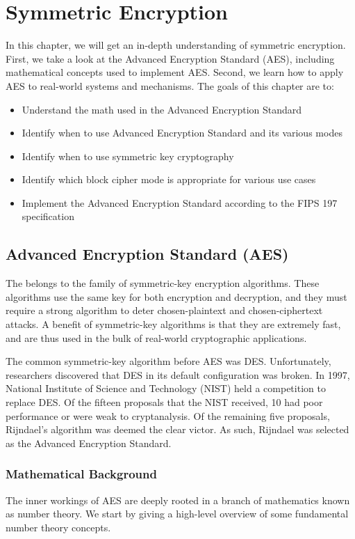 \chapter{Symmetric Encryption}
In this chapter, we will get an in-depth understanding of symmetric encryption. First, we take a look at the Advanced Encryption Standard (AES), including mathematical concepts used to implement AES. Second, we learn how to apply AES to real-world systems and mechanisms. The goals of this chapter are to:
\begin{itemize}
    \item Understand the math used in the Advanced Encryption Standard
    \item Identify when to use Advanced Encryption Standard and its various modes
    \item Identify when to use symmetric key cryptography
    \item Identify which block cipher mode is appropriate for various use cases    
    \item Implement the Advanced Encryption Standard according to the FIPS 197 specification     

\end{itemize}

\section{Advanced Encryption Standard (AES)}

The   belongs to the family of symmetric-key encryption algorithms. These algorithms use the same key for both encryption and decryption, and they must require a strong algorithm to deter chosen-plaintext and chosen-ciphertext attacks. A benefit of symmetric-key algorithms is that they are extremely fast, and are thus used in the bulk of real-world cryptographic applications.

The common symmetric-key algorithm before AES was DES. Unfortunately, researchers discovered that DES in its default configuration was broken. In 1997, National Institute of Science and Technology (NIST) held a competition to replace DES. Of the fifteen proposals that the NIST received, 10 had poor performance or were weak to cryptanalysis. Of the remaining five proposals, Rijndael's algorithm was deemed the clear victor. As such, Rijndael was selected as the Advanced Encryption Standard.

\subsection{Mathematical Background} \label{aesmath}
The inner workings of AES are deeply rooted in a branch of mathematics known as number theory. We start by giving a high-level overview of some fundamental number theory concepts.


